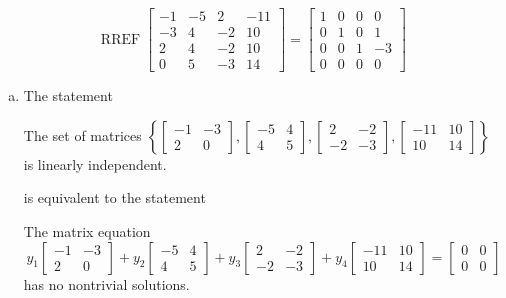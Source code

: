 \begin{exerciseAnswer} 


\[\operatorname{RREF} \left[\begin{array}{cccc}
-1 & -5 & 2 & -11 \\
-3 & 4 & -2 & 10 \\
2 & 4 & -2 & 10 \\
0 & 5 & -3 & 14
\end{array}\right] = \left[\begin{array}{cccc}
1 & 0 & 0 & 0 \\
0 & 1 & 0 & 1 \\
0 & 0 & 1 & -3 \\
0 & 0 & 0 & 0
\end{array}\right] \]


\begin{enumerate}[(a)]
\item The statement 
\begin{center}\begin{minipage}{0.8\textwidth}
 The set of matrices \( \left\{ \left[\begin{array}{cc}
-1 & -3 \\
2 & 0
\end{array}\right] , \left[\begin{array}{cc}
-5 & 4 \\
4 & 5
\end{array}\right] , \left[\begin{array}{cc}
2 & -2 \\
-2 & -3
\end{array}\right] , \left[\begin{array}{cc}
-11 & 10 \\
10 & 14
\end{array}\right] \right\} \) is linearly independent.
\end{minipage}\end{center}
     is equivalent to the statement 
\begin{center}\begin{minipage}{0.8\textwidth}
 The matrix equation \[ y_{1} \left[\begin{array}{cc}
-1 & -3 \\
2 & 0
\end{array}\right] + y_{2} \left[\begin{array}{cc}
-5 & 4 \\
4 & 5
\end{array}\right] + y_{3} \left[\begin{array}{cc}
2 & -2 \\
-2 & -3
\end{array}\right] + y_{4} \left[\begin{array}{cc}
-11 & 10 \\
10 & 14
\end{array}\right] = \left[\begin{array}{cc}
0 & 0 \\
0 & 0
\end{array}\right] \] has no nontrivial solutions. 
\end{minipage}\end{center}
    

\end{enumerate}
\end{exerciseAnswer}
